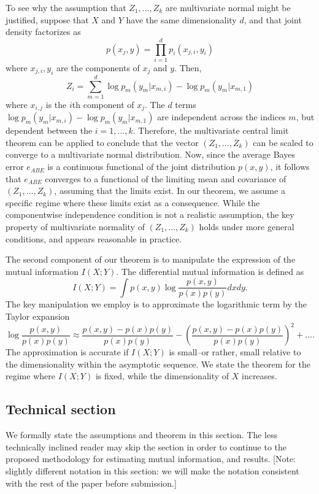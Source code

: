 \documentclass[12pt]{article}
\begin{document}
To see why the assumption that $Z_1,\hdots, Z_k$ are multivariate normal might be justified, suppose that $X$ and $Y$ have the same dimensionality $d$, and that
joint density factorizes as
\[
p(x_j, y) = \prod_{i=1}^d p_i(x_{j, i}, y_i)
\]
where $x_{j, i}, y_i$ are the components of $x_j$ and $y$.
Then,
\[
Z_i = \sum_{m=1}^d \log p_m(y_m | x_{m, i}) - \log p_m(y_m | x_{m, 1})
\]
where $x_{i, j}$ is the $i$th component of $x_j$.
The $d$ terms $\log p_m(y_m | x_{m, i}) - \log p_m(y_m | x_{m, 1})$ are independent across the indices $m$,
but dependent between the $i = 1,\hdots, k$.
Therefore, the multivariate central limit theorem can be applied to conclude that the vector
$(Z_1,\hdots, Z_k)$ can be scaled to converge to a multivariate normal distribution.
Now, since the average Bayes error $e_{ABE}$ is a continuous functional of the joint distribution $p(x, y)$,
it follows that $e_{ABE}$ converges to a functional of the limiting mean and covariance of $(Z_1,\hdots, Z_k)$, assuming
that the limits exist.
In our theorem, we assume a specific regime where these limits exist as a consequence.
While the componentwise independence condition is not a realistic assumption,
the key property of multivariate normality of $(Z_1,\hdots, Z_k)$ holds under more general conditions, and appears reasonable in practice.

The second component of our theorem is to manipulate the expression of the mutual information $I(X; Y)$.
The differential mutual information is defined as
\[
I(X; Y) = \int p(x, y) \log \frac{p(x, y)}{p(x) p(y)} dx dy.
\]
The key manipulation we employ is to approximate the logarithmic term by the Taylor expansion
\[
\log \frac{p(x, y)}{p(x) p(y)} \approx \frac{p(x, y) - p(x) p(y)}{p(x) p(y)} - \left(\frac{p(x, y) - p(x) p(y)}{p(x) p(y)}\right)^2 + \hdots.
\]
The approximation is accurate if $I(X; Y)$ is small--or rather, small relative to the dimensionality within the asymptotic sequence.
We state the theorem for the regime where $I(X; Y)$ is fixed, while the dimensionality of $X$ increases.



\subsection{Technical section}

We formally state the assumptions and theorem in this section.  The less technically inclined reader may skip the section in order to continue to the proposed methodology for estimating mutual information, and results. [Note: slightly different notation in this section: we will make the notation consistent with the rest of the paper before submission.]
\end{document}

